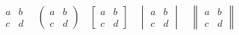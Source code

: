 \usepackage{amsmath}

$$
\begin{matrix}
a & b \\
c & d
\end{matrix}

\quad
\begin{pmatrix} 
a & b \\
c & d
\end{pmatrix}

\quad
\begin{bmatrix}
a & b \\
c & d
\end{bmatrix}

\quad
\begin{vmatrix}
a & b \\
c & d
\end{vmatrix}

\quad
\begin{Vmatrix}
a & b \\
c & d
\end{Vmatrix}
$$